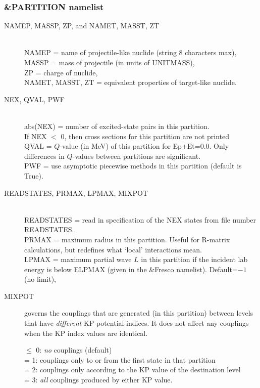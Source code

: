 \documentclass[11pt]{article}
\begin{document}
\subsubsection{\&PARTITION namelist}
%
\begin{description}
\item[NAMEP,  MASSP,  ZP,  and NAMET,   MASST,    ZT] ~\\
NAMEP = name of projectile-like nuclide (string 8 characters max),  \\
MASSP = mass of projectile (in units of UNITMASS), \\
ZP = charge of nuclide, \\
NAMET, MASST, ZT = equivalent properties of target-like nuclide.

\item[NEX,  QVAL, PWF] ~\\
abs(NEX) = number of excited-state pairs in this partition. \\
If NEX $<$ 0, then cross sections for this partition are not printed\\
QVAL = $Q$-value (in MeV) of this partition for Ep+Et=0.0. Only differences in $Q$-values between partitions are significant.\\
PWF = use asymptotic piecewise methods in this partition (default is True).

\item[READSTATES, PRMAX, LPMAX, MIXPOT]  ~\\
READSTATES = read in specification of the NEX states from file number READSTATES. \\
PRMAX = maximum radius in this partition. Useful for R-matrix calculations, but redefines what `local' interactions mean.\\
LPMAX = maximum partial wave $L$ in this partition if the incident lab energy is below ELPMAX (given in the \&Fresco namelist). Default=$-1$ (no limit),

\item[MIXPOT] governs the couplings that are generated (in this partition) between levels that have {\em different} KP potential indices.
It does not affect any couplings when the KP index values are identical.

 $\leq$ 0: {\em no} couplings (default)
\\ = 1:  couplings only to or from the first state in that partition
\\ = 2:  couplings only according to the KP value of the destination level
\\ = 3:  {\em all} couplings produced by either KP value.


\end{description}
\end{document}
